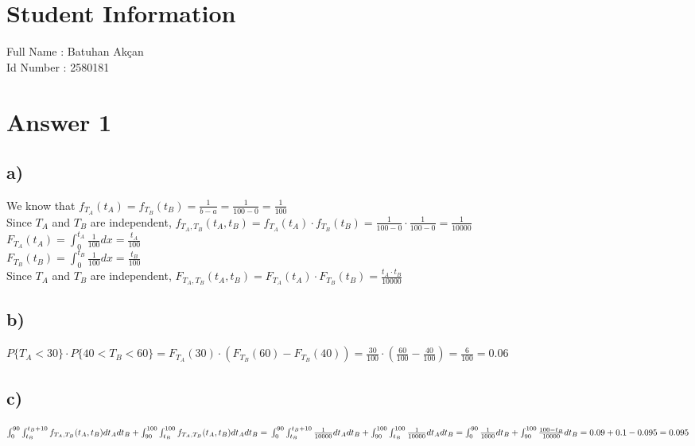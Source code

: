 \documentclass[12pt]{article}
\begin{document}
\section*{Student Information } 
Full Name : Batuhan Akçan  \\
Id Number : 2580181 \\

\section*{Answer 1}

\subsection*{a)}
We know that $f_{T_A}(t_A) = f_{T_B}(t_B) = \frac{1}{b-a} = \frac{1}{100-0} = \frac{1}{100}$\\
Since $T_A$ and $T_B$ are independent, $f_{T_A,T_B}(t_A, t_B) = f_{T_A}(t_A)\cdot f_{T_B}(t_B) = \frac{1}{100-0} \cdot \frac{1}{100-0} = \frac{1}{10000}$\\
$F_{T_A}(t_A) = \int_{0}^{t_A} \frac{1}{100} dx = \frac{t_A}{100}$\\
$F_{T_B}(t_B) = \int_{0}^{t_B} \frac{1}{100} dx = \frac{t_B}{100}$\\
Since $T_A$ and $T_B$ are independent, $F_{T_A,T_B}(t_A, t_B) = F_{T_A}(t_A)\cdot F_{T_B}(t_B) = \frac{t_A\cdot t_B}{10000}$
\subsection*{b)} 
$P\{T_A < 30\}\cdot P\{40 < T_B < 60\} = F_{T_A}(30) \cdot (F_{T_B}(60)-F_{T_B}(40)) = \frac{30}{100} \cdot (\frac{60}{100} - \frac{40}{100}) = \frac{6}{100} = 0.06$
\subsection*{c)} 
$ \int_{0}^{90} \int_{t_B}^{t_B+10} f_{T_A,T_B}(t_A,t_B) dt_Adt_B + \int_{90}^{100} \int_{t_B}^{100} f_{T_A,T_B}(t_A,t_B) dt_Adt_B =\vspace{0.2cm}\\
\int_{0}^{90} \int_{t_B}^{t_B+10} \frac{1}{10000} dt_Adt_B + \int_{90}^{100} \int_{t_B}^{100} \frac{1}{10000} dt_Adt_B = \int_{0}^{90} \frac{1}{1000} dt_B + \int_{90}^{100} \frac{100-t_B}{10000} dt_B = 0.09+0.1-0.095 \vspace{0.2cm}\\
= 0.095 $
\end{document}
